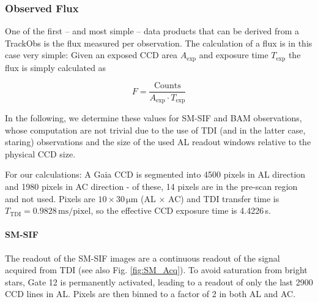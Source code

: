\documentclass[a4paper, 11pt]{article}
\begin{document}
\subsubsection{Observed Flux}

One of the first -- and most simple -- data products that can be derived from a TrackObs is the flux measured per observation. The calculation of a flux is in this case very simple: Given an exposed CCD area $A_\mathrm{exp}$ and exposure time $T_\mathrm{exp}$ the flux is simply calculated as

\begin{equation}
  F = \frac{\mathrm{Counts}}{A_\mathrm{exp} \cdot T_\mathrm{exp}}
\end{equation}

In the following, we determine these values for SM-SIF and BAM observations, whose computation are not trivial due to the use of TDI (and in the latter case, staring) observations and the size of the used AL readout windows relative to the physical CCD size.

For our calculations: A Gaia CCD is segmented into 4500 pixels in AL direction and 1980 pixels in AC direction - of these, 14 pixels are in the pre-scan region and not used. Pixels are $10 \times 30\, \mathrm{\mu m}$ (AL $\times$ AC) and TDI transfer time is $T_\mathrm{TDI} = 0.9828\, \mathrm{ms/pixel}$, so the effective CCD exposure time is 4.4226\,s.

\paragraph{SM-SIF \\}

The readout of the SM-SIF images are a continuous readout of the signal acquired from TDI (see also Fig. \ref{fig:SM_Acq}). To avoid saturation from bright stars, Gate 12 is permanently activated, leading to a readout of only the last 2900 CCD lines in AL. Pixels are then binned to a factor of 2 in both AL and AC.
\end{document}

